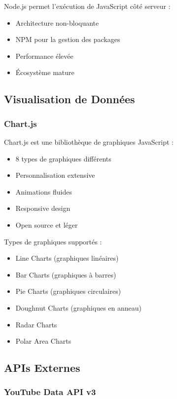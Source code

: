 Node.js permet l'exécution de JavaScript côté serveur :
\begin{itemize}
    \item Architecture non-bloquante
    \item NPM pour la gestion des packages
    \item Performance élevée
    \item Écosystème mature
\end{itemize}

\subsection{Visualisation de Données}

\subsubsection{Chart.js}

Chart.js est une bibliothèque de graphiques JavaScript :
\begin{itemize}
    \item 8 types de graphiques différents
    \item Personnalisation extensive
    \item Animations fluides
    \item Responsive design
    \item Open source et léger
\end{itemize}

Types de graphiques supportés :
\begin{itemize}
    \item Line Charts (graphiques linéaires)
    \item Bar Charts (graphiques à barres)
    \item Pie Charts (graphiques circulaires)
    \item Doughnut Charts (graphiques en anneau)
    \item Radar Charts
    \item Polar Area Charts
\end{itemize}

\subsection{APIs Externes}

\subsubsection{YouTube Data API v3}

